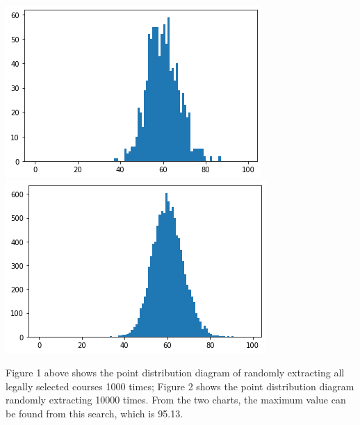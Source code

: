 \includegraphics[scale=1.3]{images/1000times.png}
\includegraphics[scale=1.3]{images/10000times.png}

Figure 1 above shows the point distribution diagram of randomly extracting all legally selected courses 1000 times; Figure 2 shows the point distribution diagram randomly extracting 10000 times. From the two charts,  the maximum value can be found from this search, which is 95.13.
